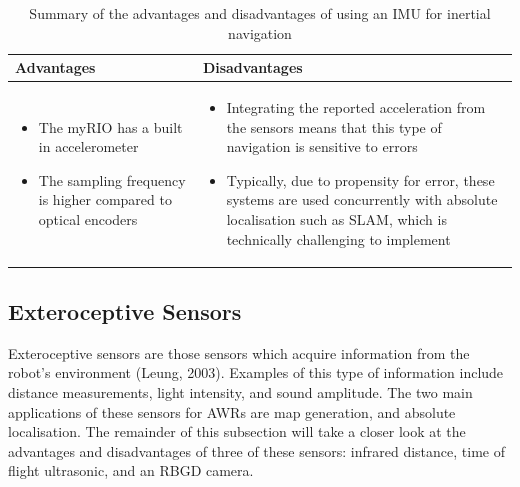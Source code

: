 \documentclass[a4paper]{article}
\begin{document}
\begin{table}[h]
\centering
\caption{Summary of the advantages and disadvantages of using an IMU for inertial navigation} \footnotesize
\begin{tabular}{p{8cm}p{8cm}}
\toprule
\textbf{Advantages} & \textbf{Disadvantages}\\
\midrule
\begin{itemize}[leftmargin=0.3cm] \item The myRIO has a built in accelerometer \item The sampling frequency is higher compared to optical encoders \end{itemize} & \begin{itemize}[leftmargin=0.3cm] \item Integrating the reported acceleration from the sensors means that this type of navigation is sensitive to errors \item Typically, due to propensity for error, these systems are used concurrently with absolute localisation such as SLAM, which is technically challenging to implement \end{itemize}\\
\bottomrule
\end{tabular}
\end{table}

\newpage

\subsection{Exteroceptive Sensors}
Exteroceptive sensors are those sensors which acquire information from the robot's environment (Leung, 2003). Examples of this type of information include distance measurements, light intensity, and sound amplitude. The two main applications of these sensors for AWRs are map generation, and absolute localisation. The remainder of this subsection will take a closer look at the advantages and disadvantages of three of these sensors: infrared distance, time of flight ultrasonic, and an RBGD camera.
\end{document}
